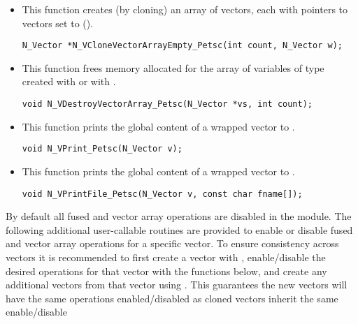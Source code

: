 \begin{itemize}

\item {}
 
  This function creates (by cloning) an array of  {\nvecpetsc} vectors,
  each with pointers to {\petsc} vectors set to ().
 
\begin{verbatim}
N_Vector *N_VCloneVectorArrayEmpty_Petsc(int count, N_Vector w);
\end{verbatim}


\item {}
 
 This function frees memory allocated for the array of  variables of
 type  created with  or with
 .
 

 \verb|void N_VDestroyVectorArray_Petsc(N_Vector *vs, int count);|



\item {}
  
  This function prints the global content of a wrapped {\petsc} vector to .
    
  \verb|void N_VPrint_Petsc(N_Vector v);|


\item {}
  
  This function prints the global content of a wrapped {\petsc} vector to .

  \verb|void N_VPrintFile_Petsc(N_Vector v, const char fname[]);|

\end{itemize}
By default all fused and vector array operations are disabled in the {\nvecpetsc}
module. The following additional user-callable routines are provided to
enable or disable fused and vector array operations for a specific vector. To
ensure consistency across vectors it is recommended to first create a vector
with , enable/disable the desired operations for that vector
with the functions below, and create any additional vectors from that vector
using . This guarantees the new vectors will have the same
operations enabled/disabled as cloned vectors inherit the same enable/disable
